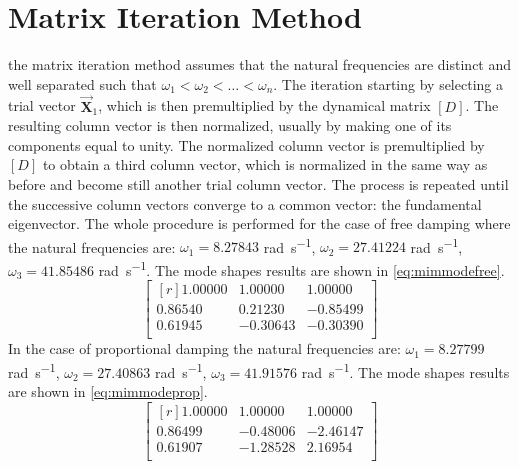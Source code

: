 \section{Matrix Iteration Method}\label{sec:mim}
the matrix iteration method assumes that the natural frequencies are distinct
and well separated such that \(\omega_1 < \omega_2 < \dots < \omega_n\).
The iteration starting by selecting a trial vector \(\vec{\mathbf{X}}_{1}\),
which is then premultiplied by the dynamical matrix \([D]\).
The resulting column vector is then normalized, usually by making one of its
components equal to unity.
The normalized column vector is premultiplied by \([D]\) to obtain a third
column vector, which is normalized in the same way as before and become still
another trial column vector.
The process is repeated until the successive column vectors converge to a common
vector: the fundamental eigenvector.
%
The whole procedure is performed for the case of free damping where the natural
frequencies are: \(\omega_{1} = 8.27843\) \si{\radian\per\second}, \(\omega_{2}
= 27.41224\) \si{\radian\per\second}, \(\omega_{3} = 41.85486\)
\si{\radian\per\second}.
The mode shapes results are shown in \eqref{eq:mimmodefree}.
 \begin{equation}
\label{eq:mimmodefree}
 \begin{bmatrix*}[r]
	1.00000 & 1.00000 & 1.00000 \\
	0.86540 & 0.21230 &-0.85499 \\
	0.61945 &-0.30643 &-0.30390 \\
	 \end{bmatrix*}
\end{equation}
%
In the case of proportional damping the natural frequencies are:
\(\omega_{1} = 8.27799\) \si{\radian\per\second}, \(\omega_{2} = 27.40863\)
\si{\radian\per\second}, \(\omega_{3} = 41.91576\) \si{\radian\per\second}.
The mode shapes results are shown in \eqref{eq:mimmodeprop}.
 \begin{equation}\label{eq:mimmodeprop}
 \begin{bmatrix*}[r]
	1.00000 & 1.00000 & 1.00000 \\
	0.86499 &-0.48006 &-2.46147 \\
	0.61907 &-1.28528 & 2.16954 \\
	 \end{bmatrix*}
\end{equation}
